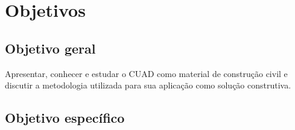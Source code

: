 \chapter{Objetivos}





\section{Objetivo geral}


Apresentar, conhecer e estudar o CUAD como material de construção civil e discutir a metodologia utilizada para sua aplicação como solução construtiva. 

\section{Objetivo específico}

%

